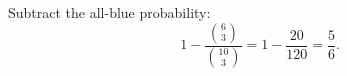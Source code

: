Subtract the all-blue probability:
\[
1-\dfrac{\binom63}{\binom{10}{3}}=1-\dfrac{20}{120}=\boxed{\dfrac{5}{6}}.
\]
